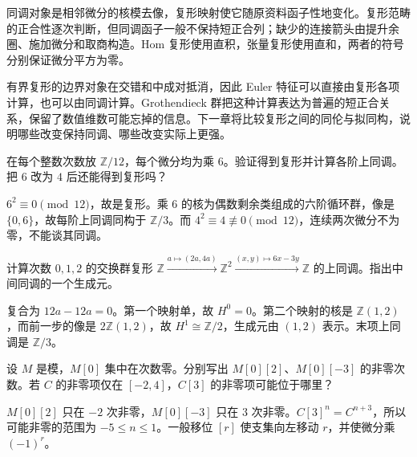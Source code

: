 \begin{chaptersummary}
同调对象是相邻微分的核模去像，复形映射使它随原资料函子性地变化。复形范畴的正合性逐次判断，但同调函子一般不保持短正合列；缺少的连接箭头由提升余圈、施加微分和取商构造。Hom 复形使用直积，张量复形使用直和，两者的符号分别保证微分平方为零。

\ProseParagraphBreak
有界复形的边界对象在交错和中成对抵消，因此 Euler 特征可以直接由复形各项计算，也可以由同调计算。Grothendieck 群把这种计算表达为普遍的短正合关系，保留了数值维数可能忘掉的信息。下一章将比较复形之间的同伦与拟同构，说明哪些改变保持同调、哪些改变实际上更强。
\end{chaptersummary}

\BookExercises

\begin{exercise}\label{b4:ex:05-periodic}
在每个整数次数放 \(\mathbb Z/12\)，每个微分均为乘 \(6\)。验证得到复形并计算各阶上同调。把 \(6\) 改为 \(4\) 后还能得到复形吗？
\end{exercise}
\begin{solution}
\(6^2\equiv0\pmod {12}\)，故是复形。乘 \(6\) 的核为偶数剩余类组成的六阶循环群，像是 \(\{0,6\}\)，故每阶上同调同构于 \(\mathbb Z/3\)。而 \(4^2\equiv4\not\equiv0\pmod {12}\)，连续两次微分不为零，不能谈其同调。
\end{solution}

\begin{exercise}\label{b4:ex:05-integer-matrices}
计算次数 \(0,1,2\) 的交换群复形
\(\mathbb Z\xrightarrow{a\mapsto(2a,4a)}\mathbb Z^2
\xrightarrow{(x,y)\mapsto6x-3y}\mathbb Z\)
的上同调。指出中间同调的一个生成元。
\end{exercise}
\begin{solution}
复合为 \(12a-12a=0\)。第一个映射单，故 \(H^0=0\)。第二个映射的核是 \(\mathbb Z(1,2)\)，而前一步的像是 \(2\mathbb Z(1,2)\)，故 \(H^1\cong\mathbb Z/2\)，生成元由 \((1,2)\) 表示。末项上同调是 \(\mathbb Z/3\)。
\end{solution}

\begin{exercise}\label{b4:ex:05-shift-support}
设 \(M\) 是模，\(M[0]\) 集中在次数零。分别写出 \(M[0][2]\)、\(M[0][-3]\) 的非零次数。若 \(C\) 的非零项仅在 \([-2,4]\)，\(C[3]\) 的非零项可能位于哪里？
\end{exercise}
\begin{solution}
\(M[0][2]\) 只在 \(-2\) 次非零，\(M[0][-3]\) 只在 \(3\) 次非零。\(C[3]^n=C^{n+3}\)，所以可能非零的范围为 \(-5\le n\le1\)。一般移位 \([r]\) 使支集向左移动 \(r\)，并使微分乘 \((-1)^r\)。
\end{solution}

